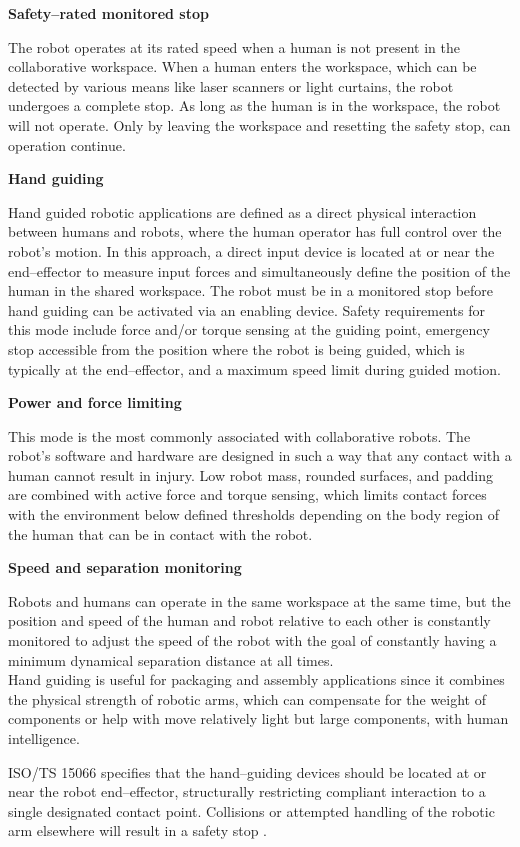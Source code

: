 \documentclass[11pt,a4paper,twoside,openright]{book}
\newcommand{\smalltitle}[1]{%
  \vspace{0.5cm}%
  \noindent\textbf{#1}%
  \vspace{0.2cm}%
  \par\noindent%
}
\begin{document}
\smalltitle{Safety--rated monitored stop}
The robot operates at its rated speed when a human is not present in the collaborative workspace. When a human enters the workspace, which can be detected by various means like laser scanners or light curtains, the robot undergoes a complete stop. As long as the human is in the workspace, the robot will not operate. Only by leaving the workspace and resetting the safety stop, can operation continue.

\smalltitle{Hand guiding}
Hand guided robotic applications are defined as a direct physical interaction between humans and robots, where the human operator has full control over the robot's motion. In this approach, a direct input device is located at or near the end--effector to measure input forces and simultaneously define the position of the human in the shared workspace. The robot must be in a monitored stop before hand guiding can be activated via an enabling device. Safety requirements for this mode include force and/or torque sensing at the guiding point, emergency stop accessible from the position where the robot is being guided, which is typically at the end--effector, and a maximum speed limit during guided motion.

\smalltitle{Power and force limiting}
This mode is the most commonly associated with collaborative robots. The robot's software and hardware are designed in such a way that any contact with a human cannot result in injury. Low robot mass, rounded surfaces, and padding are combined with active force and torque sensing, which limits contact forces with the environment below defined thresholds depending on the body region of the human that can be in contact with the robot.

\smalltitle{Speed and separation monitoring}
Robots and humans can operate in the same workspace at the same time, but the position and speed of the human and robot relative to each other is constantly monitored to adjust the speed of the robot with the goal of constantly having a minimum dynamical separation distance at all times. \\

Hand guiding is useful for packaging and assembly applications since it combines the physical strength of robotic arms, which can compensate for the weight of components or help with move relatively light but large components, with human intelligence.

ISO/TS 15066 specifies that the hand--guiding devices should be located at or near the robot end--effector, structurally restricting compliant interaction to a single designated contact point. Collisions or attempted handling of the robotic arm elsewhere will result in a safety stop \cite{sicilianoSpringerHandbookRobotics2016a}.
\end{document}
